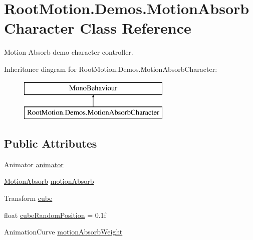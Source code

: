 \hypertarget{class_root_motion_1_1_demos_1_1_motion_absorb_character}{}\section{Root\+Motion.\+Demos.\+Motion\+Absorb\+Character Class Reference}
\label{class_root_motion_1_1_demos_1_1_motion_absorb_character}


Motion Absorb demo character controller.  


Inheritance diagram for Root\+Motion.\+Demos.\+Motion\+Absorb\+Character\+:\begin{figure}[H]
\begin{center}
\leavevmode
\includegraphics[height=2.000000cm]{class_root_motion_1_1_demos_1_1_motion_absorb_character}
\end{center}
\end{figure}
\subsection*{Public Attributes}
\begin{DoxyCompactItemize}
\item 
Animator \mbox{\hyperlink{class_root_motion_1_1_demos_1_1_motion_absorb_character_a7c408825c4e28a9e2b9444dc92a54640}{animator}}
\item 
\mbox{\hyperlink{class_root_motion_1_1_demos_1_1_motion_absorb}{Motion\+Absorb}} \mbox{\hyperlink{class_root_motion_1_1_demos_1_1_motion_absorb_character_a9d751709f93f6ee580cbcba011a688ae}{motion\+Absorb}}
\item 
Transform \mbox{\hyperlink{class_root_motion_1_1_demos_1_1_motion_absorb_character_a163e244a76b01b9561574206be22cbbe}{cube}}
\item 
float \mbox{\hyperlink{class_root_motion_1_1_demos_1_1_motion_absorb_character_a337cbfe30394c3981b118b4879b1bddb}{cube\+Random\+Position}} = 0.\+1f
\item 
Animation\+Curve \mbox{\hyperlink{class_root_motion_1_1_demos_1_1_motion_absorb_character_a561323d06ca0c2c511a0b6a03c8d534c}{motion\+Absorb\+Weight}}
\end{DoxyCompactItemize}


